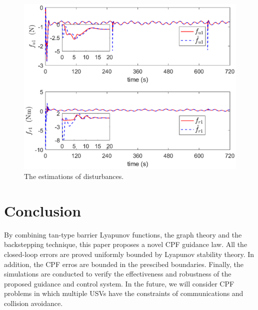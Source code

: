 \documentclass[english]{cccconf}
\begin{document}
\begin{figure}[!htb]
	\centering
	\includegraphics[width=\hsize]{RBFNN.eps}
	\caption{The estimations of disturbances.}
	\label{rbfnn}
\end{figure}

\section{Conclusion}

By combining tan-type barrier Lyapunov functions, the graph theory and the backstepping technique, this paper proposes a novel CPF guidance law. All the closed-loop errors are proved uniformly bounded by Lyapunov stability theory. In addition, the CPF erros are bounded in the prescibed boundaries. Finally, the simulations are conducted to verify the effectiveness and robustness of the proposed guidance and control system. In the future, we will consider CPF problems in which multiple USVs have the constraints of communications and collision avoidance. 

%
\end{document}
